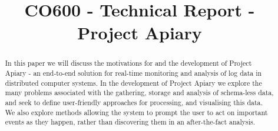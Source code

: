 \documentclass[10pt, a4paper, conference, compsocconf]{IEEEtran}
\begin{document}


%
\title{CO600 - Technical Report - Project Apiary}



\author{
  \and
  \and
  \and
}

\maketitle

\begin{abstract}
In this paper we will discuss the motivations for and the development of Project
Apiary - an end-to-end solution for real-time monitoring and analysis of log
data in distributed computer systems. In the development of Project Apiary we
explore the many problems associated with the gathering, storage and analysis of
schema-less data, and seek to define user-friendly approaches for processing,
and visualising this data. We also explore methods allowing the system to prompt
the user to act on important events as they happen, rather than discovering them
in an after-the-fact analysis.
\end{abstract}

%

\IEEEpeerreviewmaketitle









\end{document}
